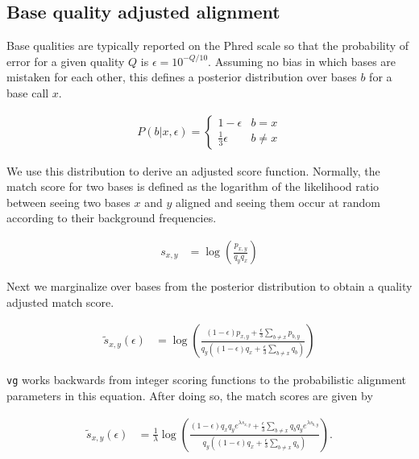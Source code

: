 \subsection{Base quality adjusted alignment}

Base qualities are typically reported on the Phred scale so that the probability of error for a given quality $Q$ is $\epsilon = 10^{-Q/10}$. Assuming no bias in which bases are mistaken for each other, this defines a posterior distribution over bases $b$ for a base call $x$.

\begin{align}
    P(b|x, \epsilon) = \begin{cases}
        1 - \epsilon & b = x \\
        \frac{1}{3} \epsilon & b \neq x
    \end{cases}
\end{align}

We use this distribution to derive an adjusted score function. Normally, the match score for two bases is defined as the logarithm of the likelihood ratio between seeing two bases $x$ and $y$ aligned and seeing them occur at random according to their background frequencies. 

\begin{align}
    s_{x,y} &= \log\left(\frac{p_{x,y}}{q_y q_x} \right) \label{eqn:base_score}
\end{align}

Next we marginalize over bases from the posterior distribution to obtain a quality adjusted match score.

\begin{align}
    \tilde s_{x,y}(\epsilon) &= \log\left(\frac{(1 - \epsilon)p_{x,y} + \frac{\epsilon}{3}\sum_{b \neq x}p_{b, y}}{q_y\left((1 - \epsilon)q_x + \frac{\epsilon}{3}\sum_{b \neq x}q_b \right)} \right)
\end{align}

{\tt vg} works backwards from integer scoring functions to the probabilistic alignment parameters in this equation. After doing so, the match scores are given by

\begin{align}
    \tilde s_{x,y}(\epsilon) &= \frac{1}{\lambda} \log\left(\frac{(1 - \epsilon)q_x q_y e^{\lambda s_{x,y}} + \frac{\epsilon}{3}\sum_{b \neq x}q_b q_y e^{\lambda s_{b,y}}}{q_y\left((1 - \epsilon)q_x + \frac{\epsilon}{3}\sum_{b \neq x}q_b \right)} \right).
\end{align}

